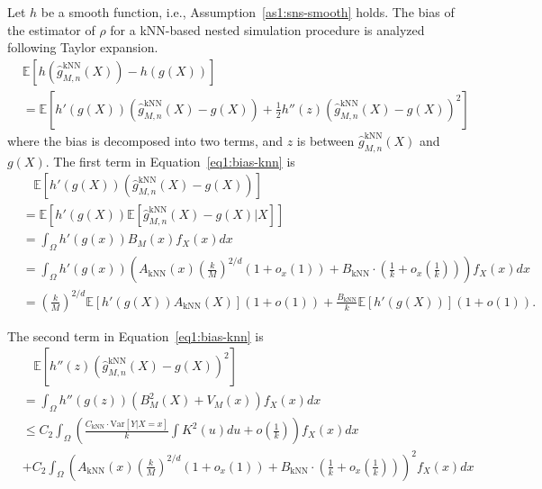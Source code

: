Let $h$ be a smooth function, i.e., Assumption~\ref{as1:sns-smooth} holds.
The bias of the estimator of $\rho$ for a kNN-based nested simulation procedure is analyzed following Taylor expansion.
\begin{align} \label{eq1:bias-knn}
    & \mathbb{E} \left[ h(\hat{g}^{\text{kNN}}_{M, n}(X)) - h(g(X)) \right] \nonumber \\
    & = \mathbb{E} \left[ h'(g(X)) \left( \hat{g}^{\text{kNN}}_{M, n}(X) - g(X) \right) + \frac{1}{2} h''(z) \left( \hat{g}^{\text{kNN}}_{M, n}(X) - g(X) \right)^2 \right] 
\end{align}
where the bias is decomposed into two terms, and $z$ is between $\hat{g}^{\text{kNN}}_{M, n}(X)$ and $g(X)$.
The first term in Equation~\ref{eq1:bias-knn} is 
\begin{align} \label{eq1:bias-knn-1}
    & ~~~~ \mathbb{E} \left[ h'(g(X)) \left( \hat{g}^{\text{kNN}}_{M, n}(X) - g(X) \right) \right]  \nonumber \\
    & = \mathbb{E} \left[ h'(g(X)) \mathbb{E}\left[ \hat{g}^{\text{kNN}}_{M, n}(X) - g(X) |X\right] \right] \nonumber \\
    & = \int_{\Omega} h'(g(x)) B_M(x) f_X(x) dx \nonumber \\
    & = \int_{\Omega} h'(g(x)) \left( A_{\text{kNN}}(x) \left(\frac{k}{M}\right)^{2/d} \left(1+o_x(1)\right) + B_{\text{kNN}} \cdot \left(\frac{1}{k} + o_x\left(\frac{1}{k}\right)\right) \right) f_X(x) dx \nonumber \\
    & = \left(\frac{k}{M}\right)^{2/d} \mathbb{E} \left[ h'(g(X)) A_{\text{kNN}}(X) \right] (1+ o(1)) + \frac{B_{\text{kNN}}}{k} \mathbb{E} \left[ h'(g(X)) \right] (1+ o(1)).
\end{align}

The second term in Equation~\ref{eq1:bias-knn} is 
\begin{align} \label{eq1:bias-knn-2}
    & ~~~~ \mathbb{E} \left[ h''(z) \left( \hat{g}^{\text{kNN}}_{M, n}(X) - g(X) \right)^2 \right]  \nonumber \\
    & = \int_{\Omega} h''(g(z)) \left(B_M^2(X) + V_M(x)\right) f_X(x) dx \nonumber \\
    & \leq C_2 \int_{\Omega} \left( \frac{C_{\text{kNN}} \cdot \text{Var}[Y| X = x]}{k} \int K^2(u) du + o\left(\frac{1}{k}\right) \right) f_X(x) dx \nonumber \\
    & + C_2 \int_{\Omega} \left( A_{\text{kNN}}(x) \left(\frac{k}{M}\right)^{2/d} \left(1+o_x(1)\right) + B_{\text{kNN}} \cdot \left(\frac{1}{k} + o_x\left(\frac{1}{k}\right)\right) \right)^2 f_X(x) dx 
\end{align}

